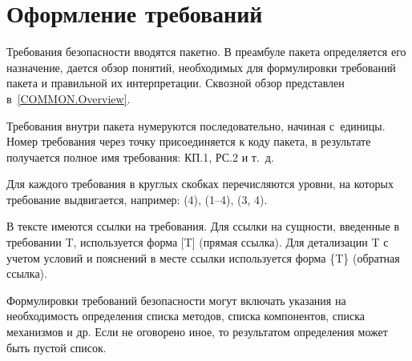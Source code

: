 \section{Оформление требований}\label{COMMON.Notation}

Требования безопасности вводятся пакетно. В преамбуле пакета определяется 
его назначение, дается обзор понятий, необходимых для формулировки 
требований пакета и правильной их интерпретации.
%
Сквозной обзор представлен в~\ref{COMMON.Overview}.

Требования внутри пакета нумеруются последовательно, начиная с~единицы.
%
Номер требования через точку присоединяется к коду пакета, 
в результате получается полное имя требования: КП.1, РС.2 и т.~д.

Для каждого требования в круглых скобках перечисляются уровни, 
на которых требование выдвигается, например: (4), (1--4), (3, 4).

В тексте имеются ссылки на требования. 
%
Для ссылки на сущности, введенные в требовании T, используется 
форма [T] (прямая ссылка).
%
Для детализации T с учетом условий и пояснений в месте ссылки 
используется  форма \{T\} (обратная ссылка).

Формулировки требований безопасности могут включать указания на 
необходимость определения списка методов, списка компонентов, 
списка механизмов и др.
%
Если не оговорено иное, то результатом определения может быть пустой список.
